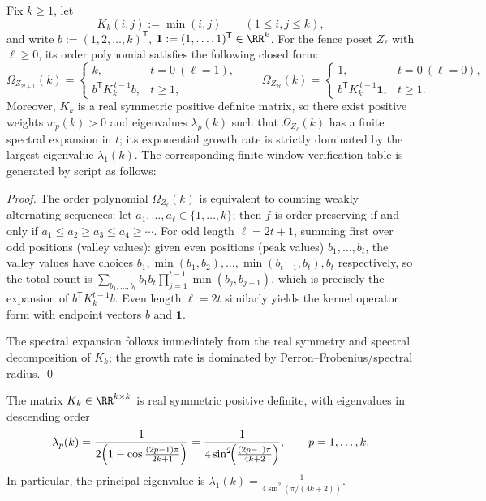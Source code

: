 \begin{theorem}\label{thm:pom-fence-order-poly-spectral}
Fix \(k\ge 1\), let
\[
K_k(i,j):=\min(i,j)\qquad(1\le i,j\le k),
\]
and write \(b:=(1,2,\dots,k)^{\mathsf T}\), \(\mathbf 1:=(1,\dots,1)^{\mathsf T}\in\RR^k\).
For the fence poset \(Z_\ell\) with \(\ell\ge 0\), its order polynomial satisfies the following closed form:
\[
\Omega_{Z_{2t+1}}(k)=
\begin{cases}
k,& t=0\ (\ell=1),\\
b^{\mathsf T}K_k^{\,t-1}b,& t\ge 1,
\end{cases}
\qquad
\Omega_{Z_{2t}}(k)=
\begin{cases}
1,& t=0\ (\ell=0),\\
b^{\mathsf T}K_k^{\,t-1}\mathbf 1,& t\ge 1.
\end{cases}
\]
Moreover, \(K_k\) is a real symmetric positive definite matrix, so there exist positive weights \(w_p(k)>0\) and eigenvalues \(\lambda_p(k)\) such that
\(\Omega_{Z_\ell}(k)\) has a finite spectral expansion in \(t\); its exponential growth rate is strictly dominated by the largest eigenvalue \(\lambda_1(k)\).
The corresponding finite-window verification table is generated by script as follows:

\end{theorem}
\begin{proof}
The order polynomial \(\Omega_{Z_\ell}(k)\) is equivalent to counting weakly alternating sequences:
let \(a_1,\dots,a_\ell\in\{1,\dots,k\}\); then \(f\) is order-preserving if and only if
\(
a_1\le a_2\ge a_3\le a_4\ge\cdots
\).
For odd length \(\ell=2t+1\), summing first over odd positions (valley values): given even positions (peak values) \(b_1,\dots,b_t\),
the valley values have choices \(b_1,\min(b_1,b_2),\dots,\min(b_{t-1},b_t),b_t\) respectively, so the total count is
\(\sum_{b_1,\dots,b_t} b_1b_t\prod_{j=1}^{t-1}\min(b_j,b_{j+1})\), which is precisely the expansion of \(b^{\mathsf T}K_k^{t-1}b\).
Even length \(\ell=2t\) similarly yields the kernel operator form with endpoint vectors \(b\) and \(\mathbf 1\).
\par
The spectral expansion follows immediately from the real symmetry and spectral decomposition of \(K_k\); the growth rate is dominated by Perron--Frobenius/spectral radius. \qed
\end{proof}
\begin{lemma}[Complete spectral closed form for \texorpdfstring{\(K_k(i,j)=\min(i,j)\)}{K_k(i,j)=min(i,j)}]\label{lem:pom-Kk-eigenvalues}
The matrix \(K_k\in\RR^{k\times k}\) is real symmetric positive definite, with eigenvalues in descending order
\[
\lambda_p(k)=\frac{1}{2\Bigl(1-\cos\frac{(2p-1)\pi}{2k+1}\Bigr)}
=\frac{1}{4\sin^2\!\Bigl(\frac{(2p-1)\pi}{4k+2}\Bigr)},
\qquad p=1,\dots,k.
\]
In particular, the principal eigenvalue is
\(
\lambda_1(k)=\frac{1}{4\sin^2(\pi/(4k+2))}
\).
\end{lemma}
